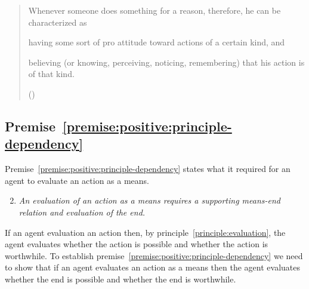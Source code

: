\documentclass[10pt]{article}
\newcommand{\hand}{\ding{43}}
\newcommand{\hozlinedash}[0]{%
  \noindent\hdashrule[0.5ex][c]{\textwidth}{.1pt}{2.5pt}
}
\begin{document}
\begin{quote}
  Whenever someone does something for a reason, therefore, he can be characterized as
  \begin{enumerate*}[label=(\alph*), ref=(\alph*)]
  \item\label{davidson:a} having some sort of pro attitude toward actions of a certain kind, and
  \item\label{davidson:b} believing (or knowing, perceiving, noticing, remembering) that his action is of that kind.
  \end{enumerate*}
  \mbox{}\hfill\mbox{(\citeyear[686--686]{Davidson:1963aa})}
\end{quote}

\hozlinedash







\newpage

\subsection{Premise~\ref{premise:positive:principle-dependency}}
\label{sec:premise-2}

Premise~\ref{premise:positive:principle-dependency} states what it required for an agent to evaluate an action as a means.

\hozlinedash

\begin{enumerate}[label=P\arabic*., ref=(P\arabic*)]
  \setcounter{enumi}{1}
\item \emph{An evaluation of an action as a means requires a supporting means-end relation and evaluation of the end.}
\end{enumerate}



\hozlinedash

If an agent evaluation an action then, by principle~\ref{principle:evaluation}, the agent evaluates whether the action is possible and whether the action is worthwhile.
To establish premise~\ref{premise:positive:principle-dependency} we need to show that if an agent evaluates an action as a means then the agent evaluates whether the end is possible and whether the end is worthwhile.
\end{document}
